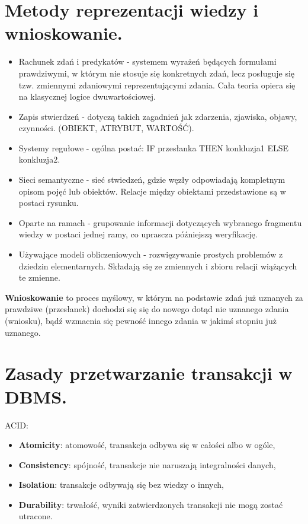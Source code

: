 \documentclass[12pt,a4paper]{article}
\begin{document}
	\section{Metody reprezentacji wiedzy i wnioskowanie.}
	\begin{itemize}
		\item Rachunek zdań i predykatów -  systemem wyrażeń będących formułami prawdziwymi, w którym nie stosuje się konkretnych zdań, lecz posługuje się tzw. zmiennymi zdaniowymi reprezentującymi zdania. Cała teoria opiera się na klasycznej logice dwuwartościowej.
		
		\item Zapis stwierdzeń - dotyczą takich zagadnień jak zdarzenia, zjawiska, objawy, czynności. (OBIEKT, ATRYBUT, WARTOŚĆ).
		
		\item Systemy regułowe - ogólna postać: IF przesłanka THEN konkluzja1 ELSE konkluzja2.
		
		\item Sieci semantyczne - sieć stwiedzeń, gdzie węzły odpowiadają kompletnym opisom pojęć lub obiektów. Relacje między obiektami przedstawione są w postaci rysunku.
		
		\item Oparte na ramach - grupowanie informacji dotyczących wybranego fragmentu wiedzy w postaci jednej ramy, co uprascza późniejszą weryfikację.
		
		\item Używające modeli obliczeniowych - rozwięzywanie prostych problemów z dziedzin elementarnych. Składają się ze zmiennych i zbioru relacji wiążących te zmienne.
	\end{itemize}

	\textbf{Wnioskowanie} to proces myślowy, w którym na podstawie zdań już uznanych za prawdziwe (przesłanek) dochodzi się się do nowego dotąd nie uznanego zdania (wniosku), bądź wzmacnia się pewność innego zdania w jakimś stopniu już uznanego.


	\section{Zasady przetwarzanie transakcji w DBMS.}
	ACID:
	\begin{itemize}
		\item \textbf{Atomicity}: atomowość, transakcja odbywa się w całości albo w ogóle,
		\item \textbf{Consistency}: spójność, transakcje nie naruszają integralności danych,
		\item \textbf{Isolation}: transakcje odbywają się bez wiedzy o innych,
		\item \textbf{Durability}: trwałość, wyniki zatwierdzonych transakcji nie mogą zostać utracone.
	\end{itemize}
\end{document}
